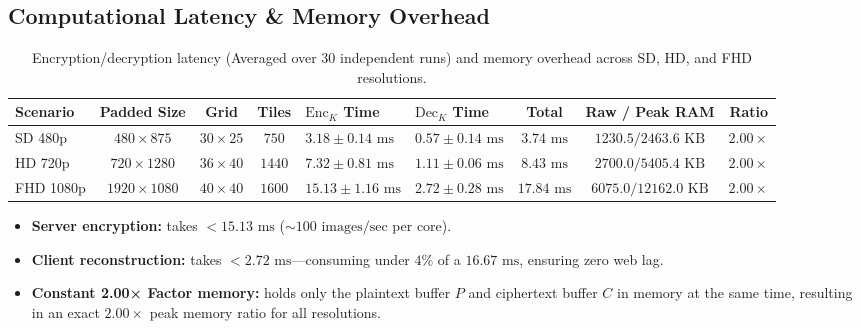 \documentclass{article}
\begin{document}
\subsection{Computational Latency \& Memory Overhead}

\begin{table}[H]
\centering
\footnotesize
\begin{tabularx}{\textwidth}{l c c c >{\centering\arraybackslash}X >{\centering\arraybackslash}X c c c}
\toprule
\textbf{Scenario} & \textbf{Padded Size} & \textbf{Grid} & \textbf{Tiles} & \textbf{$\mathrm{Enc}_K$ Time} & \textbf{$\mathrm{Dec}_K$ Time} & \textbf{Total} & \textbf{Raw / Peak RAM} & \textbf{Ratio} \\
\midrule
SD 480p & $480 \times 875$ & $30 \times 25$ & $750$ & $3.18 \pm 0.14\text{ ms}$ & $0.57 \pm 0.14\text{ ms}$ & $3.74\text{ ms}$ & $1230.5 / 2463.6\text{ KB}$ & $2.00\times$ \\
HD 720p & $720 \times 1280$ & $36 \times 40$ & $1440$ & $7.32 \pm 0.81\text{ ms}$ & $1.11 \pm 0.06\text{ ms}$ & $8.43\text{ ms}$ & $2700.0 / 5405.4\text{ KB}$ & $2.00\times$ \\
FHD 1080p & $1920 \times 1080$ & $40 \times 40$ & $1600$ & $15.13 \pm 1.16\text{ ms}$ & $2.72 \pm 0.28\text{ ms}$ & $17.84\text{ ms}$ & $6075.0 / 12162.0\text{ KB}$ & $2.00\times$ \\
\bottomrule
\end{tabularx}
\caption{Encryption/decryption latency (Averaged over 30 independent runs) and memory overhead across SD, HD, and FHD resolutions.}
\label{tab:latency_memory}
\end{table}

\begin{itemize}
    \item \textbf{Server encryption:} takes $<15.13\text{ ms}$ ($\sim 100\text{ images/sec}$ per core).

    \item \textbf{Client reconstruction:} takes $<2.72\text{ ms}$---consuming under $4\%$ of a $16.67\text{ ms}$, ensuring zero web lag.
    
    \item \textbf{Constant 2.00× Factor memory:} holds only the plaintext buffer $P$ and ciphertext buffer $C$ in memory at the same time, resulting in an exact $2.00\times$ peak memory ratio for all resolutions.
\end{itemize}
\end{document}
